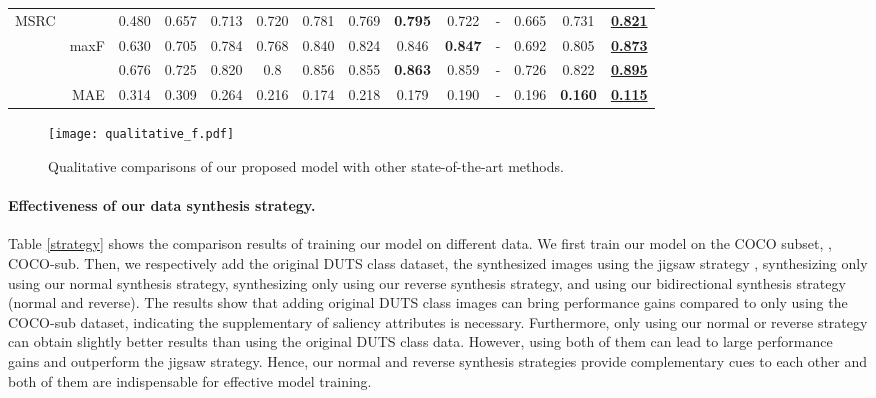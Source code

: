 \documentclass[10pt,twocolumn,letterpaper]{article}
\def\blu#1{\textbf{\color{blue} #1}} \def\red#1{\textbf{\color{red}\underline{#1}}}
\begin{document}
\begin{table*}[t]
\begin{tabular}{lr|ccccccccccc|c}
     \hline
  \multirow{4}{*}{MSRC}
    &    &0.480 &0.657	&0.713 &0.720 &0.781 &0.769	&\blu{0.795} &0.722	&-	&0.665	&0.731	&\red{0.821} \\
    & maxF  &0.630 &0.705 &0.784 &0.768 &0.840 &0.824 &0.846 &\blu{0.847} &- &0.692 &0.805 &\red{0.873}\\
    &   &0.676 &0.725 &0.820 &0.8 &0.856 &0.855 &\blu{0.863} &0.859 &-	&0.726 &0.822 &\red{0.895}\\
    \cite{winn2005object}& MAE &0.314 &0.309 &0.264 &0.216 &0.174 &0.218 &0.179 &0.190	&- &0.196 &\blu{0.160} &\red{0.115} \\
     \hline
  \end{tabular}
  \label{SOTA}
\end{table*}

\begin{figure*}[t]
  \graphicspath{{Figures/qualitative/}}
  \centering
  \texttt{[image: qualitative\_f.pdf]}
  \caption{Qualitative comparisons of our proposed model with other state-of-the-art methods.}
  \label{qualitative}
  \vspace{-0.3cm}
\end{figure*}


\vspace{-3mm}
\paragraph{Effectiveness of our data synthesis strategy.}
Table \ref{strategy} shows the comparison results of training our model on different data.
We first train our model on the COCO subset, \ie, COCO-sub. Then, we respectively add the original DUTS class dataset, the synthesized images using the jigsaw strategy \cite{zhang2020gicd}, synthesizing only using our normal synthesis strategy, synthesizing only using our reverse synthesis strategy, and using our bidirectional synthesis strategy (normal and reverse).
The results show that adding original DUTS class images can bring performance gains compared to only using the COCO-sub dataset, indicating the supplementary of saliency attributes is necessary. 
Furthermore, only using our normal or reverse strategy can obtain slightly better results than using the original DUTS class data. However, using both of them can lead to large performance gains and outperform the jigsaw strategy. Hence, our normal and reverse synthesis strategies provide complementary cues to each other and both of them are indispensable for effective model training.
\end{document}
